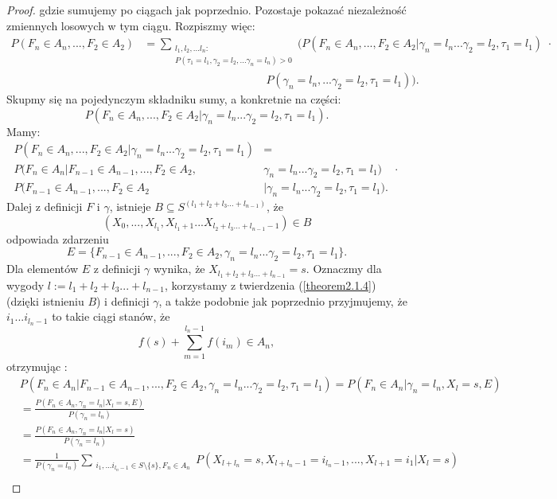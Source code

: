 \documentclass[a4paper]{article}
\theoremstyle{defn}
\theoremstyle{theorem}
\theoremstyle{lemma}
\theoremstyle{cor}
\theoremstyle{fact}
\begin{document}
\begin{proof}
gdzie sumujemy po ciągach jak poprzednio.
Pozostaje pokazać niezależność zmiennych losowych w tym ciągu. Rozpiszmy więc:
\begin{align*}
    P(F_n \in A_n, ..., F_2 \in A_2) &= \sum\limits_{\substack{l_1, l_2, ... l_n:\\P(\tau_1 = l_1, \gamma_2 = l_2, ... \gamma_n = l_n) > 0}}(P(F_n \in A_n, ..., F_2 \in A_2|\gamma_n = l_n ... \gamma_2 = l_2, \tau_1 = l_1)\,\, \cdot \\
    &\quad\quad\quad\quad\quad\quad\quad\quad\quad\quad\quad P(\gamma_n = l_n, ... \gamma_2 = l_2, \tau_1 = l_1)).
\end{align*}
Skupmy się na pojedynczym składniku sumy, a konkretnie na części:
$$P(F_n \in A_n, ..., F_2 \in A_2|\gamma_n = l_n ... \gamma_2 = l_2, \tau_1 = l_1).$$
Mamy:
\begin{align*}
    P(F_n \in A_n, ..., F_2 \in A_2 |\gamma_n = l_n ... \gamma_2 = l_2, \tau_1 = l_1) &=\\
    P(F_n \in A_n|F_{n-1} \in A_{n-1},  ..., F_2 \in A_2, &\gamma_n = l_n ... \gamma_2 = l_2, \tau_1 = l_1)\quad \cdot \\
    P(F_{n-1} \in A_{n-1},  ..., F_2 \in A_2 &|\gamma_n = l_n ... \gamma_2 = l_2, \tau_1 = l_1).
\end{align*}
Dalej z definicji $F$ i $\gamma$, istnieje $B \subseteq S^{(l_1 + l_2 + l_3 ... +l_{n-1})}$, że $$(X_0, ..., X_{l_1}, X_{l_1+1} ... X_{l_2 + l_3 ... + l_{n-1} - 1}) \in B$$
odpowiada zdarzeniu 
$$E = \{F_{n-1} \in A_{n-1},  ..., F_2 \in A_2, \gamma_n = l_n ... \gamma_2 = l_2, \tau_1 = l_1\}.$$
Dla elementów $E$ z definicji $\gamma$ wynika, że $X_{l_1 + l_2 + l_3 ... + l_{n-1}} = s$. Oznaczmy dla wygody $l := l_1 + l_2 + l_3 ... + l_{n-1}$, korzystamy z twierdzenia (\ref{theorem2.1.4}) (dzięki istnieniu $B$) i definicji $\gamma$, a także podobnie jak poprzednio przyjmujemy, że $i_1 ... i_{l_n-1}$ to takie ciągi stanów, że $$f(s) + \sum\limits_{m = 1}^{l_n-1} f(i_m) \in A_n,$$
otrzymując :
\begin{align*}
    &P(F_n \in A_n|F_{n-1} \in A_{n-1},  ..., F_2 \in A_2, \gamma_n = l_n ... \gamma_2 = l_2, \tau_1 = l_1) = P(F_n \in A_n|\gamma_n = l_n, X_l = s, E)
\end{align*}
\begin{align*}
    &= \frac{P(F_n \in A_n, \gamma_n = l_n | X_l = s, E)}{P(\gamma_n = l_n)}\\
    &= \frac{P(F_n \in A_n, \gamma_n = l_n | X_l = s)}{P(\gamma_n = l_n)}\\
    &= \frac{1}{P(\gamma_n = l_n)} \sum\limits_{\substack{i_1, ... i_{l_n - 1} \in S\setminus \{s\}, F_n \in A_n}} P(X_{l+l_n} = s, X_{l+l_{n}-1} = i_{l_{n}-1}, ..., X_{l+1} = i_1 | X_l = s)\\

\end{align*}
\end{proof}
\end{document}
